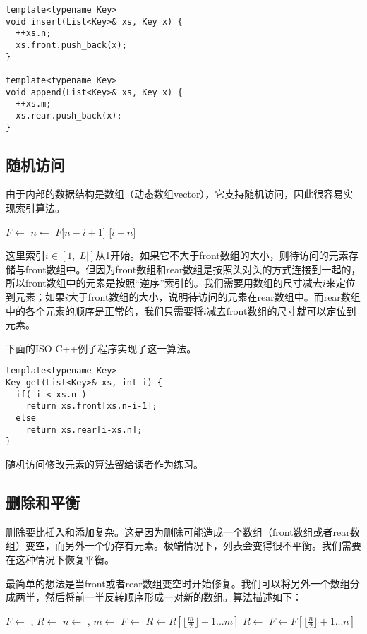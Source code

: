 \documentclass[UTF8]{article}
\begin{document}
\begin{lstlisting}
template<typename Key>
void insert(List<Key>& xs, Key x) {
  ++xs.n;
  xs.front.push_back(x);
}

template<typename Key>
void append(List<Key>& xs, Key x) {
  ++xs.m;
  xs.rear.push_back(x);
}
\end{lstlisting}

\subsection{随机访问}
由于内部的数据结构是数组（动态数组vector），它支持随机访问，因此很容易实现索引算法。

\begin{algorithmic}
  \State $F \gets $ 
  \State $n \gets $ 
    \State \Return $F$[$n-i+1$]
  \Else
    \State {}[$i-n$]
  \EndIf
\EndFunction
\end{algorithmic}

这里索引$i \in [1, |L|]$从1开始。如果它不大于front数组的大小，则待访问的元素存储与front数组中。但因为front数组和rear数组是按照头对头的方式连接到一起的，所以front数组中的元素是按照“逆序”索引的。我们需要用数组的尺寸减去$i$来定位到元素；如果$i$大于front数组的大小，说明待访问的元素在rear数组中。而rear数组中的各个元素的顺序是正常的，我们只需要将$i$减去front数组的尺寸就可以定位到元素。

下面的ISO C++例子程序实现了这一算法。

\begin{lstlisting}
template<typename Key>
Key get(List<Key>& xs, int i) {
  if( i < xs.n )
    return xs.front[xs.n-i-1];
  else
    return xs.rear[i-xs.n];
}
\end{lstlisting}

随机访问修改元素的算法留给读者作为练习。

\subsection{删除和平衡}
删除要比插入和添加复杂。这是因为删除可能造成一个数组（front数组或者rear数组）变空，而另外一个仍存有元素。极端情况下，列表会变得很不平衡。我们需要在这种情况下恢复平衡。

最简单的想法是当front或者rear数组变空时开始修复。我们可以将另外一个数组分成两半，然后将前一半反转顺序形成一对新的数组。算法描述如下：

\begin{algorithmic}
  \State $F \gets$ , $R \gets$ 
  \State $n \gets$ , $m \gets$ 
    \State $F \gets$ 
    \State $R \gets R[\lfloor \frac{m}{2} \rfloor + 1 ... m]$
    \State $R \gets$ 
    \State $F \gets F[\lfloor \frac{n}{2} \rfloor + 1 ... n]$
  \EndIf
\EndFunction
\end{algorithmic}
\end{document}
